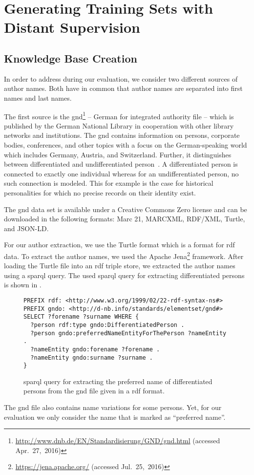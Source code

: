 \section{Generating Training Sets with Distant Supervision}\label{sec:i-distant-supervision}

\subsection{Knowledge Base Creation}\label{subsec:i-knowledge-base-creation}

In order to address  during our evaluation, we consider two different sources of author names.
Both have in common that author names are separated into first names and last names.

\bigskip

The first source is the \acrfull{gnd}\footnote{\url{http://www.dnb.de/EN/Standardisierung/GND/gnd.html} (accessed Apr.~27,~2016)} -- German for integrated authority file --  which is published by the German National Library in cooperation with other library networks and institutions.
The \gls{gnd} contains information on persons, corporate bodies, conferences, and other topics with a focus on the German-speaking world which includes Germany, Austria, and Switzerland.
Further, it distinguishes between differentiated and undifferentiated person~\citep{hochstein2013ihr}.
A differentiated person is connected to exactly one individual whereas for an undifferentiated person, no such connection is modeled.
This for example is the case for historical personalities for which no precise records on their identity exist.

The \gls{gnd} data set is available under a Creative Commons Zero license and can be downloaded in the following formats: Marc 21, MARCXML, RDF/XML, Turtle, and JSON-LD.\@

For our author extraction, we use the Turtle format which is a format for \gls{rdf} data.
To extract the author names, we used the Apache Jena\footnote{\url{https://jena.apache.org/} (accessed Jul.~25,~2016)} framework.
After loading the Turtle file into an \gls{rdf} triple store, we extracted the author names using a \gls{sparql} query.
The used \gls{sparql} query for extracting differentiated persons is shown in .
\begin{figure}[t]
\begin{lstlisting}[basicstyle=\ttfamily]
PREFIX rdf: <http://www.w3.org/1999/02/22-rdf-syntax-ns#>
PREFIX gndo: <http://d-nb.info/standards/elementset/gnd#>
SELECT ?forename ?surname WHERE {
  ?person rdf:type gndo:DifferentiatedPerson .
  ?person gndo:preferredNameEntityForThePerson ?nameEntity .
  ?nameEntity gndo:forename ?forename .
  ?nameEntity gndo:surname ?surname .
}
\end{lstlisting}
\caption{\gls{sparql} query for extracting the preferred name of differentiated persons from the \gls{gnd} file given in a \gls{rdf} format.}
\label{fig:gnd-sparql-query}
\end{figure}
The \gls{gnd} file also contains name variations for some persons.
Yet, for our evaluation we only consider the name that is marked as ``preferred name''.

